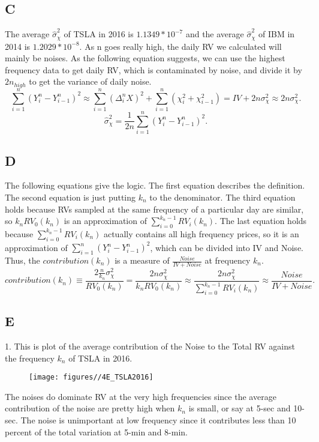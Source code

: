 \documentclass{report}
\begin{document}
\subsection{C}
The average $\hat{\sigma}_{\chi}^{2}$ of TSLA in 2016 is $1.1349*10^{-7}$ and the average $\hat{\sigma}_{\chi}^{2}$ of IBM in 2014 is $1.2029*10^{-8}$. As n goes really high, the daily RV we calculated will mainly be noises. As the following equation suggests, we can use the highest frequency data to get daily RV, which is contaminated by noise, and divide it by $2n_{high}$ to get the variance of daily noise.
\[ \sum_{i=1}^{n}( Y_{i}^{n} - Y_{i-1}^{n} )^{2} \approx \sum_{i=1}^{n}( \Delta_{i}^{n}X )^{2} + \sum_{i=1}^{n}( \chi_{i}^{2} + \chi_{i-1}^{2} ) = IV + 2n\sigma_{\chi}^{2} \approx 2n\sigma_{\chi}^{2}. \]
\[ \hat{\sigma}_{\chi}^{2} = \frac{1}{2n} \sum_{i=1}^{n}( Y_{i}^{n} - Y_{i-1}^{n} )^{2}. \]

\subsection{D}
The following equations give the logic. The first equation describes the definition. The second equation is just putting $k_{n}$ to the denominator. The third equation holds because RVs sampled at the same frequency of a particular day are similar, so $k_{n}RV_{0}(k_{n})$ is an approximation of $\sum_{i=0}^{k_{n}-1}RV_{i}(k_{n})$. The last equation holds because $\sum_{i=0}^{k_{n}-1}RV_{i}(k_{n})$ actually contains all high frequency prices, so it is an approximation of  $\sum_{i=1}^{n}( Y_{i}^{n} - Y_{i-1}^{n} )^{2}$, which can be divided into IV and Noise. Thus, the $contribution(k_{n})$ is a measure of $\frac{Noise}{IV+Noise}$ at frequency $k_{n}$.
\[ contribution(k_{n}) \equiv \frac{2\frac{n}{k_{n}}\sigma_{\chi}^{2}}{RV_{0}(k_{n})} = \frac{2n\sigma_{\chi}^{2}}{k_{n}RV_{0}(k_{n})} \approx  \frac{2n\sigma_{\chi}^{2}}{\sum_{i=0}^{k_{n}-1}RV_{i}(k_{n})} \approx \frac{Noise}{IV + Noise}. \]

\subsection{E}
1. This is plot of the average contribution of the Noise to the Total RV against the frequency $k_{n}$ of TSLA in 2016.
\begin{figure}[H]
        \centering 
         \texttt{[image: figures//4E\_TSLA2016]}
\end{figure}
The noises do dominate RV at the very high frequencies since the average contribution of the noise are pretty high when $k_{n}$ is small, or say at 5-sec and 10-sec. The noise is unimportant at low frequency since it contributes less than 10 percent of the total variation at 5-min and 8-min.
\end{document}
